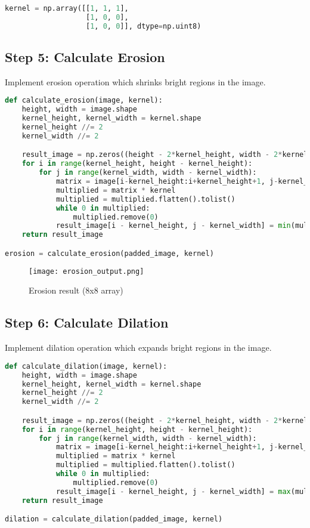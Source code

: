 \documentclass[12pt]{article}
\begin{document}
\begin{lstlisting}[language=Python]
kernel = np.array([[1, 1, 1],
                   [1, 0, 0],
                   [1, 0, 0]], dtype=np.uint8)
\end{lstlisting}

\subsection{Step 5: Calculate Erosion}
Implement erosion operation which shrinks bright regions in the image.

\begin{lstlisting}[language=Python]
def calculate_erosion(image, kernel):
    height, width = image.shape
    kernel_height, kernel_width = kernel.shape
    kernel_height //= 2
    kernel_width //= 2

    result_image = np.zeros((height - 2*kernel_height, width - 2*kernel_width), dtype=image.dtype)
    for i in range(kernel_height, height - kernel_height):
        for j in range(kernel_width, width - kernel_width):
            matrix = image[i-kernel_height:i+kernel_height+1, j-kernel_width:j+kernel_width+1]
            multiplied = matrix * kernel
            multiplied = multiplied.flatten().tolist()
            while 0 in multiplied:
                multiplied.remove(0)
            result_image[i - kernel_height, j - kernel_width] = min(multiplied)
    return result_image

erosion = calculate_erosion(padded_image, kernel)
\end{lstlisting}

\begin{figure}[H]
    \centering
    \texttt{[image: erosion\_output.png]}
    \caption{Erosion result (8x8 array)}
    \label{fig:erosion}
\end{figure}

\subsection{Step 6: Calculate Dilation}
Implement dilation operation which expands bright regions in the image.

\begin{lstlisting}[language=Python]
def calculate_dilation(image, kernel):
    height, width = image.shape
    kernel_height, kernel_width = kernel.shape
    kernel_height //= 2
    kernel_width //= 2

    result_image = np.zeros((height - 2*kernel_height, width - 2*kernel_width), dtype=image.dtype)
    for i in range(kernel_height, height - kernel_height):
        for j in range(kernel_width, width - kernel_width):
            matrix = image[i-kernel_height:i+kernel_height+1, j-kernel_width:j+kernel_width+1]
            multiplied = matrix * kernel
            multiplied = multiplied.flatten().tolist()
            while 0 in multiplied:
                multiplied.remove(0)
            result_image[i - kernel_height, j - kernel_width] = max(multiplied)
    return result_image

dilation = calculate_dilation(padded_image, kernel)
\end{lstlisting}
\end{document}

